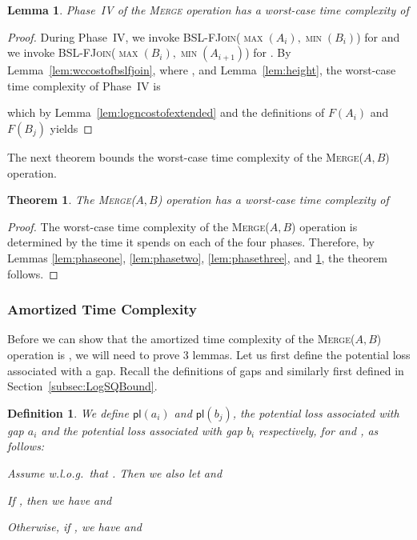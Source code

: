 \documentclass[11pt]{article}
\newcommand{\ens}[1]{\ensuremath{#1}}
\newcommand{\kwUnion}{Merge}
\newcommand{\Union}{\mbox{\textsc{\kwUnion{}}}}
\newcommand{\Unionx}[2]{\mbox{\textsc{\kwUnion(\ensuremath{#1,#2})}}}
\newcommand{\Bslfjoinx}[2]{\mbox{\textsc{BSL-FJoin(\ensuremath{#1,#2})}}}
\newcommand{\intmax}[1]{\ensuremath{\max(\intl #1)}}
\newcommand{\intmin}[1]{\ensuremath{\min(\intl #1)}}
\newcommand{\intl}[1]{\ensuremath{#1}}
\newcommand{\agap}[1]{\ensuremath{a_{#1}}}
\newcommand{\bgap}[1]{\ensuremath{b_{#1}}}
\newcommand{\intfun}[1]{\ensuremath{F(\intl #1)}}
\newcommand{\potlossa}[1]{\ens{\mathsf{pl}(\agap{#1})}}
\newcommand{\potlossb}[1]{\ens{\mathsf{pl}(\bgap{#1})}}
\newcounter{count}
\newtheorem{thm}[count]{Theorem}
\newtheorem{lemma}[count]{Lemma}
\newtheorem{defn}[count]{Definition}
\begin{document}
\begin{lemma} 
\label{lem:phasefour} 
Phase~IV of the \Union{} operation has a worst-case time complexity of  
\end{lemma} 

\begin{proof} 

During Phase~IV, we invoke \Bslfjoinx{\intmax{A_{i}}}{\intmin{B_i}} for  and we invoke \Bslfjoinx{\intmax{B_{i}}}{\intmin{A_{i+1}}} for . 
By Lemma~\ref{lem:wccostofbslfjoin}, where , and Lemma~\ref{lem:height}, the worst-case time complexity of Phase~IV is 
 
 
which by Lemma~\ref{lem:logncostofextended} and the definitions of \intfun{A_i} and \intfun{B_j} yields 
 
\end{proof} 

The next theorem bounds the worst-case time complexity of the \Unionx{A}{B} operation. 




\begin{thm} 
\label{thm:unionworstcase} 
The \Unionx{A}{B} operation has a worst-case time complexity of 
 
\end{thm} 
\begin{proof} 
The worst-case time complexity of the \Unionx{A}{B} operation is determined by the time it spends on each of the four phases. 
Therefore, by Lemmas \ref{lem:phaseone}, \ref{lem:phasetwo}, \ref{lem:phasethree}, and \ref{lem:phasefour}, the theorem follows. 


\end{proof} 



\subsubsection{Amortized Time Complexity} 
\label{subsubsec:AnalysisUnionAmortized} 

Before we can show that the amortized time complexity of the \Unionx{A}{B} operation is , we will need to prove 3 lemmas. Let us first define the potential loss associated with a gap. Recall the definitions of gaps  and similarly  first defined in Section~\ref{subsec:LogSQBound}. 

\begin{defn} 
We define \potlossa i and \potlossb j, the potential loss associated with gap \agap i and the potential loss associated with gap \bgap i respectively, for  and , as follows: 


 
Assume w.l.o.g.~that . Then we also let  and 
 
If , then we have  and 
 
Otherwise, if , we have  and 
 

\end{defn} 
\end{document}
